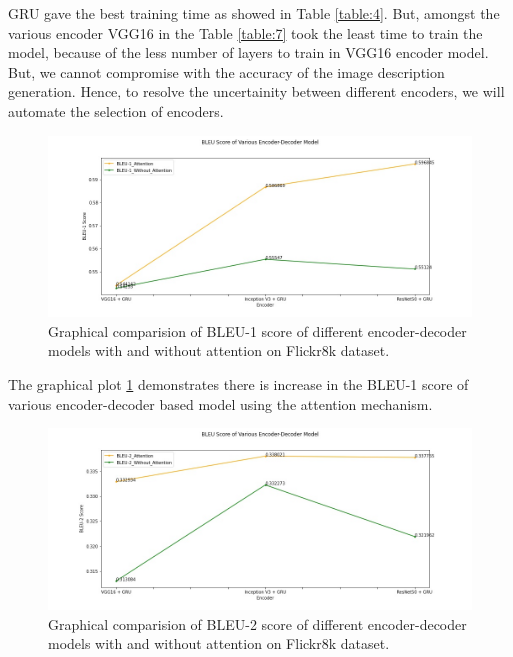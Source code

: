  \noindent GRU gave the best training time as showed in Table \ref{table:4}. But, amongst the various encoder VGG16 in the Table \ref{table:7} took the least time to train the model, because of the less number of layers to train in VGG16 encoder model. But, we cannot compromise with the accuracy of the image description generation. Hence, to resolve the uncertainity between different encoders, we will automate the selection of encoders.
 
\newpage
\begin{figure}[ht!]
    \includegraphics[scale=0.5]{chapters/5/intfig/bleu-1_score_attention.jpg}\hfill
    \caption{Graphical comparision of BLEU-1 score of different encoder-decoder models with and without attention on Flickr8k dataset.}
    \label{img:graph_bleu-1_attention}
\end{figure}

\noindent The graphical plot \ref{img:graph_bleu-1_attention} demonstrates there is increase in the BLEU-1 score of various encoder-decoder based model using the attention mechanism.

\begin{figure}[ht!]
    \includegraphics[scale=0.5]{chapters/5/intfig/bleu-2_score_attention.jpg}\hfill
    \caption{Graphical comparision of BLEU-2 score of different encoder-decoder models with and without attention on Flickr8k dataset.}
    \label{img:graph_bleu-2_attention}
\end{figure}


